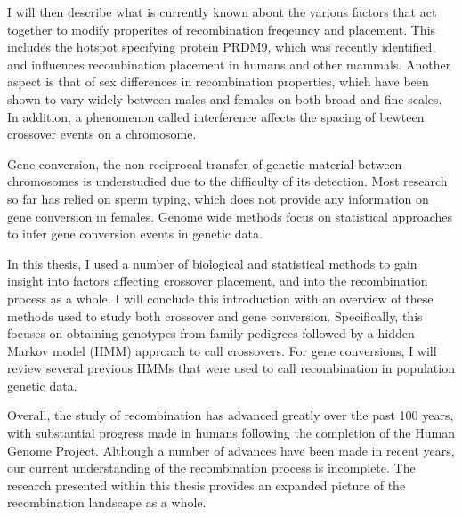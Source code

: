 
I will then describe what is currently known about the various factors that act together to modify properites of recombination freqeuncy and placement.
This includes the hotspot specifying protein PRDM9, which was recently identified, and influences recombination placement in humans and other mammals.
Another aspect is that of sex differences in recombination properties, which have been shown to vary widely between males and females on both broad and fine scales.
In addition, a phenomenon called interference affects the spacing of bewteen crossover events on a chromosome.

Gene conversion, the non-reciprocal transfer of genetic material between chromosomes is understudied due to the difficulty of its detection.
Most research so far has relied on sperm typing, which does not provide any information on gene conversion in females.
Genome wide methods focus on statistical approaches to infer gene conversion events in genetic data.

In this thesis, I used a number of biological and statistical methods to gain insight into factors affecting crossover placement, and into the recombination process as a whole.
I will conclude this introduction with an overview of these methods used to study both crossover and gene conversion.
Specifically, this focuses on obtaining genotypes from family pedigrees followed by a hidden Markov model (HMM) approach to call crossovers.
For gene conversions, I will review several previous HMMs that were used to call recombination in population genetic data.

Overall, the study of recombination has advanced greatly over the past 100 years, with substantial progress made in humans following the completion of the Human Genome Project.
Although a number of advances have been made in recent years, our current understanding of the recombination process is incomplete.
The research presented within this thesis provides an expanded picture of the recombination landscape as a whole.





